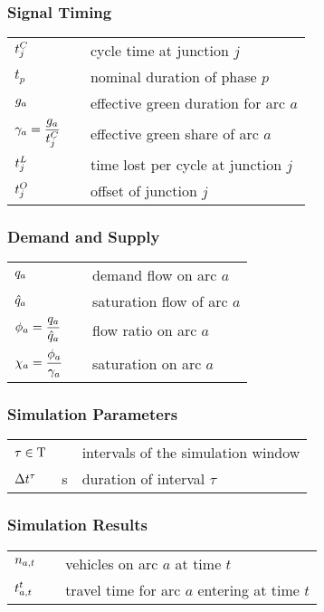 \subsubsection*{Signal Timing}
\begin{tabu} to \textwidth {X[3,c] X[1,c] X[6,l]}
$ t_{j}^C $ &  & cycle time at junction $j$\\[2pt]
$ t_p   $ &  & nominal duration of phase $p$\\[2pt]
$ g_{a}   $ &  & effective green duration for arc $a$\\[3pt]
$ \displaystyle \gamma_{a} = \frac{g_{a}}{t_j^C} $ & \units{\%} & effective green share of arc $a$\\[2pt]
$ t_{j}^L $ &  & time lost per cycle at junction $j$\\[2pt]
$ t_{j}^O $ &  & offset of junction $j$ \\[2pt]
\end{tabu} 


\subsubsection*{Demand and Supply}
\begin{tabu} to \textwidth {X[3,c] X[1,c] X[6,l]}
$ q_{a} $ &  & demand flow on arc $a$ \\[2pt]
$ \hat{q}_a $ &  & saturation flow of arc $a$ \\[2pt]

$ \displaystyle \phi_a = \frac{q_a}{\hat{q}_a} $ & & flow ratio on arc $a$ \\[2pt]
$ \displaystyle \chi_a = \frac{\phi_a}{\gamma_a} $ & & saturation on arc $a$ \\[2pt]
\end{tabu} 

\subsubsection*{Simulation Parameters}
\begin{tabu} to \textwidth {X[3,c] X[1,c] X[6,l]}
$ \tau \in \mathrm{T} $ &  & intervals of the simulation window \\[2pt]
$ \Delta t^{\tau} $ & s & duration of interval $\tau$\\[2pt]
\end{tabu}

\subsubsection*{Simulation Results}
\begin{tabu} to \textwidth {X[3,c] X[1,c] X[6,l]}
$ n_{a,t} $ &  & vehicles on arc $a$ at time $t$\\[2pt]
$ t_{a,t}^t $ &  & travel time for arc $a$ entering at time $t$ \\[2pt]
\end{tabu}


